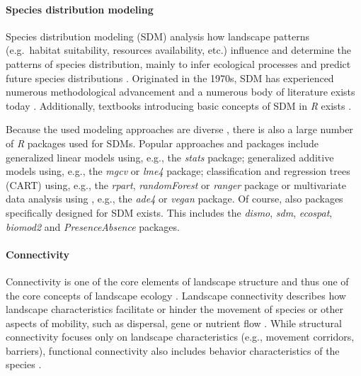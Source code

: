 \documentclass[smallextended]{svjour3}       %
\begin{document}
\hypertarget{sec:SDM}{%
\paragraph{Species distribution modeling}\label{sec:SDM}}

Species distribution modeling (SDM) analysis how landscape patterns
(e.g.~habitat suitability, resources availability, etc.) influence and
determine the patterns of species distribution, mainly to infer
ecological processes and predict future species distributions
\cite{Wiersma2011}. Originated in the 1970s, SDM has experienced
numerous methodological advancement and a numerous body of literature
exists today \cite{Zimmermann2010}. Additionally, textbooks introducing
basic concepts of SDM in \emph{R} exists \cite{Guisan2017,Fletcher2019}.

Because the used modeling approaches are diverse
\cite{Hooten2011,Kerr2011,Fletcher2019}, there is also a large number of
\emph{R} packages used for SDMs. Popular approaches and packages include
generalized linear models using, e.g., the \emph{stats} package;
generalized additive models using, e.g., the \emph{mgcv} or \emph{lme4}
package; classification and regression trees (CART) using, e.g., the
\emph{rpart}, \emph{randomForest} or \emph{ranger} package or
multivariate data analysis using , e.g., the \emph{ade4} or \emph{vegan}
package. Of course, also packages specifically designed for SDM exists.
This includes the \emph{dismo}, \emph{sdm}, \emph{ecospat},
\emph{biomod2} and \emph{PresenceAbsence} packages.

\hypertarget{sec:connectivity}{%
\paragraph{Connectivity}\label{sec:connectivity}}

Connectivity is one of the core elements of landscape structure
\cite{Taylor1993} and thus one of the core concepts of landscape ecology
\cite{With2019}. Landscape connectivity describes how landscape
characteristics facilitate or hinder the movement of species
\cite{Tischendorf2000} or other aspects of mobility, such as dispersal,
gene or nutrient flow \cite{With2019}. While structural connectivity
focuses only on landscape characteristics (e.g., movement corridors,
barriers), functional connectivity also includes behavior
characteristics of the species \cite{Tischendorf2000,With2019}.
\end{document}
